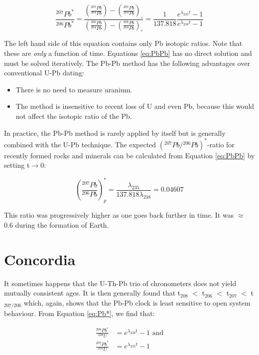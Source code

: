 \documentclass{book}
\begin{document}
\begin{equation}
\frac{^{207}Pb^*}{^{206}Pb^*} = 
\frac{\left(\frac{^{207}Pb}{^{204}Pb}\right)-\left(\frac{^{207}Pb}{^{204}Pb}\right)_\circ}
{\left(\frac{^{206}Pb}{^{204}Pb}\right)-\left(\frac{^{206}Pb}{^{204}Pb}\right)_\circ}
= \frac{1}{137.818} \frac{e^{\lambda_{235}t}-1}{e^{\lambda_{238}t}-1}
\label{eq:PbPb}
\end{equation}

The left hand side of this equation contains only Pb isotopic ratios.
Note that these are \emph{only} a function of time. Equations
\ref{eq:PbPb} has no direct solution and must be solved
iteratively. The Pb-Pb method has the following advantages over
conventional U-Pb dating:

\begin{itemize}
\item There is no need to measure uranium.
\item The method is insensitive to recent loss of U and even Pb,
  because this would not affect the isotopic ratio of the Pb.
\end{itemize}

In practice, the Pb-Pb method is rarely applied by itself but is
generally combined with the U-Pb technique. The expected
$({}^{207}Pb/{}^{206}Pb)^*$-ratio for recently formed rocks and minerals
can be calculated from Equation \ref{eq:PbPb} by setting
t$\rightarrow$0:

\begin{equation}
  \left(\frac{^{207}Pb}{^{206}Pb}\right)^*_p =
  \frac{\lambda_{235}}{137.818\lambda_{238}} = 0.04607
\label{eq:commonPb}
\end{equation}

This ratio was progressively higher as one goes back further in time.
It was $\approx$ 0.6 during the formation of Earth.

\section{Concordia}
\label{sec:concordia}

It sometimes happens that the U-Th-Pb trio of chronometers does not
yield mutually consistent ages. It is then generally found that
t$_{208}$ $<$ t$_{206}$ $<$ t$_{207}$ $<$ t$_{207/206}$ which, again,
shows that the Pb-Pb clock is least sensitive to open system
behaviour.  From Equation \ref{eq:Pb*}, we find that:

\begin{equation}
\begin{array}{rl}
\frac{^{206}Pb^*}{^{238}U} & = e^{\lambda_{238}t}-1 \mbox{~and}\\
\frac{^{207}Pb^*}{^{235}U} & = e^{\lambda_{235}t}-1
\end{array}
\label{eq:wetherill}
\end{equation}
\end{document}
